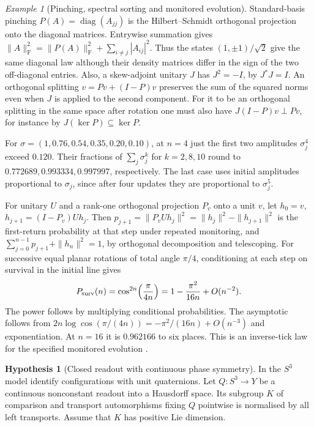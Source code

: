\documentclass[11pt,reqno]{amsart}
\theoremstyle{definition}
\newtheorem{hypothesis}[theorem]{Hypothesis}
\theoremstyle{remark}
\newtheorem{example}[theorem]{Example}
\numberwithin{equation}{section}
\begin{document}
\begin{example}[Pinching, spectral sorting and monitored evolution]\label{d4:monitor}
Standard-basis pinching \(P(A)=\operatorname{diag}(A_{jj})\) is
the Hilbert--Schmidt orthogonal projection onto the diagonal
matrices. Entrywise summation gives
\(\|A\|_{\mathrm F}^2=\|P(A)\|_{\mathrm F}^2+
\sum_{i\ne j}|A_{ij}|^2\). Thus the states
\((1,\pm1)/\sqrt2\) give the same diagonal law although their density
matrices differ in the sign of the two off-diagonal entries. Also, a
skew-adjoint unitary \(J\) has \(J^2=-I\), by \(J^*J=I\).
An orthogonal splitting \(v=Pv+(I-P)v\) preserves the sum of the
squared norms even when \(J\) is applied to the second component.
For it to be an orthogonal splitting in the same space after rotation
one must also have \(J(I-P)v\perp Pv\), for instance by
\(J(\ker P)\subseteq\ker P\).

For \(\sigma=(1,0.76,0.54,0.35,0.20,0.10)\), at \(n=4\) just the
first two amplitudes \(\sigma_j^4\) exceed \(0.120\). Their fractions
of \(\sum_j\sigma_j^k\) for \(k=2,8,10\) round to
\(0.772689,0.993334,0.997997\), respectively. The last case uses
initial amplitudes proportional to \(\sigma_j\), since after four
updates they are proportional to \(\sigma_j^5\).

For unitary \(U\) and a rank-one orthogonal projection \(P_v\) onto
a unit \(v\), let \(h_0=v\), \(h_{j+1}=(I-P_v)Uh_j\).
Then \(p_{j+1}=\|P_vUh_j\|^2=\|h_j\|^2-\|h_{j+1}\|^2\) is the
first-return probability at that step under repeated monitoring,
and \(\sum_{j=0}^{n-1}p_{j+1}+\|h_n\|^2=1\), by orthogonal
decomposition and telescoping. For successive equal planar
rotations of total angle \(\pi/4\), conditioning at each step on
survival in the initial line gives
\[
 P_{\rm surv}(n)=\cos^{2n}\!\left(\frac{\pi}{4n}\right)
       =1-\frac{\pi^2}{16n}+O(n^{-2}).
\]
The power follows by multiplying conditional probabilities. The
asymptotic follows from \(2n\log\cos(\pi/(4n))=
-\pi^2/(16n)+O(n^{-3})\) and exponentiation.
At \(n=16\) it is \(0.962166\) to six places.
This is an inverse-tick law for the specified monitored evolution
\cite{d4-zeno}.
\end{example}

\begin{hypothesis}[Closed readout with continuous phase symmetry]\label{d4:clockhyp}
In the \(S^3\) model identify configurations with unit quaternions.
Let \(Q:S^3\to Y\) be a continuous nonconstant readout into a Hausdorff
space. Its subgroup \(K\) of comparison and transport automorphisms
fixing \(Q\) pointwise is normalised by all left transports.
Assume that \(K\) has positive Lie dimension.
\end{hypothesis}
\end{document}
